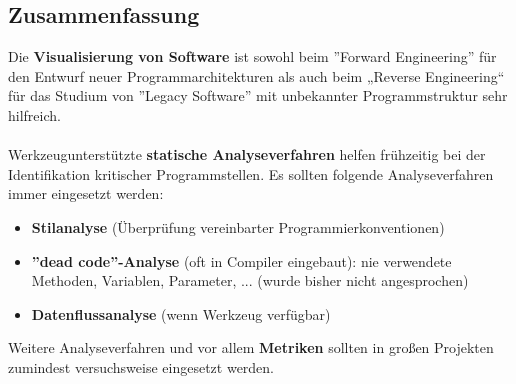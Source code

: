 \subsection{Zusammenfassung}
Die \textbf{Visualisierung von Software} ist sowohl beim ''Forward Engineering'' für den Entwurf neuer Programmarchitekturen als auch beim „Reverse Engineering“ für das Studium von ''Legacy Software'' mit unbekannter Programmstruktur sehr hilfreich.
\\
\\
Werkzeugunterstützte \textbf{statische Analyseverfahren} helfen frühzeitig bei der Identifikation kritischer Programmstellen. Es sollten folgende Analyseverfahren immer eingesetzt werden:
\begin{itemize}
	\item \textbf{Stilanalyse} (Überprüfung vereinbarter Programmierkonventionen)
	\item \textbf{''dead code''-Analyse} (oft in Compiler eingebaut): nie verwendete Methoden, Variablen, Parameter, ... (wurde bisher nicht angesprochen)
	\item \textbf{Datenflussanalyse} (wenn Werkzeug verfügbar)
\end{itemize}
Weitere Analyseverfahren und vor allem \textbf{Metriken} sollten in großen Projekten zumindest versuchsweise eingesetzt werden.

